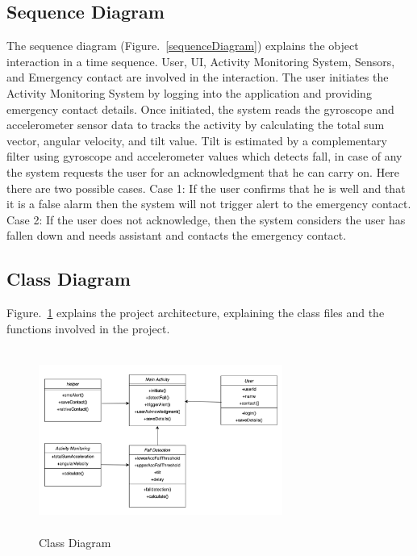 \documentclass[conference]{IEEEtran}
\begin{document}
\subsection{Sequence Diagram} 
The sequence diagram (Figure.~\ref{sequenceDiagram}) explains the object interaction in a time sequence. User, UI, Activity Monitoring System, Sensors, and Emergency contact are involved in the interaction. The user initiates the Activity Monitoring System by logging into the application and providing emergency contact details. Once initiated, the system reads the gyroscope and accelerometer sensor data to tracks the activity by calculating the total sum vector, angular velocity, and tilt value. Tilt is estimated by a complementary filter using gyroscope and accelerometer values which detects fall, in case of any the system requests the user for an acknowledgment that he can carry on. Here there are two possible cases. Case 1: If the user confirms that he is well and that it is a false alarm then the system will not trigger alert to the emergency contact. Case 2: If the user does not acknowledge, then the system considers the user has fallen down and needs assistant and contacts the emergency contact.

\subsection{Class Diagram}
Figure.~\ref{classDiagram} explains the project architecture, explaining the class files and the functions involved in the project.

\begin{figure}
\centerline{\includegraphics[width=8cm, height=6cm]{classDiagram.png}}
\caption{Class Diagram}
\label{classDiagram}
\end{figure}
\end{document}
